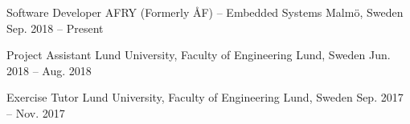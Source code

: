 \cventry
{Software Developer} %
{AFRY (Formerly ÅF) -- Embedded Systems} %
{Malmö, Sweden} %
{Sep. 2018 -- Present } %
{ }

\cventry
{Project Assistant} %
{Lund University, Faculty of Engineering} %
{Lund, Sweden} %
{Jun. 2018 -- Aug. 2018 } %
{ }

\cventry
{Exercise Tutor} %
{Lund University, Faculty of Engineering} %
{Lund, Sweden} %
{Sep. 2017 -- Nov. 2017 } %
{ }

